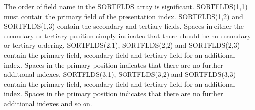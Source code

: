 \begin{small}
{{      The order of field name in the SORTFLDS array is significant.
      SORTFLDS(1,1) must contain the primary field of the presentation index.
      SORTFLDS(1,2) and SORTFLDS(1,3) contain the secondary and tertiary fields.
      Spaces in either the secondary or tertiary position simply indicates
      that there should be no secondary or tertiary ordering.
      SORTFLDS(2,1), SORTFLDS(2,2) and SORTFLDS(2,3) contain the primary field,
      secondary field and tertiary field for an additional index. Spaces in the
      primary position indicates that there are no further additional indexes.
      SORTFLDS(3,1), SORTFLDS(3,2) and SORTFLDS(3,3) contain the primary field,
      secondary field and tertiary field for an additional index. Spaces in the
      primary position indicates that there are no further additional indexes
      and so on.

}}
\end{small}
